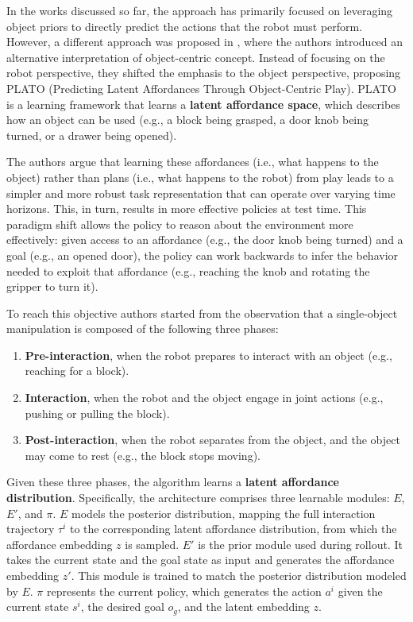 In the works discussed so far, the approach has primarily focused on leveraging object priors to directly predict the actions that the robot must perform. However, a different approach was proposed in \cite{belkhale2023plato}, where the authors introduced an alternative interpretation of object-centric concept. Instead of focusing on the robot perspective, they shifted the emphasis to the object perspective, proposing PLATO (Predicting Latent Affordances Through Object-Centric Play). PLATO is a learning framework that learns a \textbf{latent affordance space}, which describes how an object can be used (e.g., a block being grasped, a door knob being turned, or a drawer being opened).

The authors argue that learning these affordances (i.e., what happens to the object) rather than plans (i.e., what happens to the robot) from play leads to a simpler and more robust task representation that can operate over varying time horizons. This, in turn, results in more effective policies at test time. This paradigm shift allows the policy to reason about the environment more effectively: given access to an affordance (e.g., the door knob being turned) and a goal (e.g., an opened door), the policy can work backwards to infer the behavior needed to exploit that affordance (e.g., reaching the knob and rotating the gripper to turn it).

To reach this objective authors started from the observation that a single-object manipulation is composed of the following three phases:
\begin{enumerate}
    \item \textbf{Pre-interaction}, when the robot prepares to interact with an object (e.g., reaching for a block).
    \item \textbf{Interaction}, when the robot and the object engage in joint actions (e.g., pushing or pulling the block).
    \item \textbf{Post-interaction}, when the robot separates from the object, and the object may come to rest (e.g., the block stops moving).
\end{enumerate}
Given these three phases, the algorithm learns a \textbf{latent affordance distribution}. Specifically, the architecture comprises three learnable modules: \( E \), \( E' \), and \( \pi \). \( E \) models the posterior distribution, mapping the full interaction trajectory \( \tau^{i} \) to the corresponding latent affordance distribution, from which the affordance embedding \( z \) is sampled. \( E' \) is the prior module used during rollout. It takes the current state and the goal state as input and generates the affordance embedding \( z' \). This module is trained to match the posterior distribution modeled by \( E \). \( \pi \) represents the current policy, which generates the action \( a^{i} \) given the current state \( s^{i} \), the desired goal \( o_g \), and the latent embedding \( z \).


